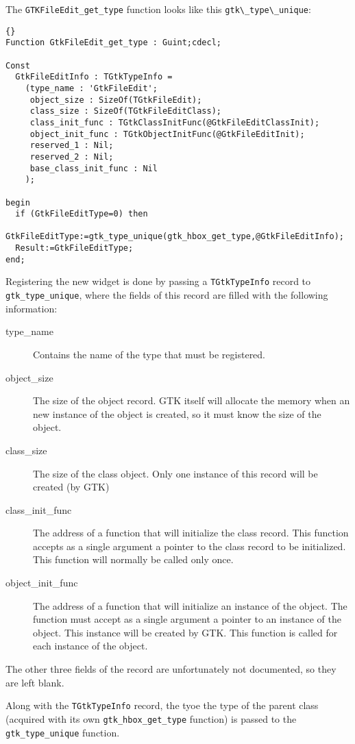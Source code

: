 \documentclass[10pt]{article}
\begin{document}
The \lstinline|GTKFileEdit_get_type| function looks like this
\lstinline|gtk\_type\_unique|:
\begin{lstlisting}{}
Function GtkFileEdit_get_type : Guint;cdecl;

Const
  GtkFileEditInfo : TGtkTypeInfo =
    (type_name : 'GtkFileEdit';   
     object_size : SizeOf(TGtkFileEdit);
     class_size : SizeOf(TGtkFileEditClass);
     class_init_func : TGtkClassInitFunc(@GtkFileEditClassInit);
     object_init_func : TGtkObjectInitFunc(@GtkFileEditInit);   
     reserved_1 : Nil;
     reserved_2 : Nil;
     base_class_init_func : Nil
    );

begin
  if (GtkFileEditType=0) then
    GtkFileEditType:=gtk_type_unique(gtk_hbox_get_type,@GtkFileEditInfo);
  Result:=GtkFileEditType;  
end;
\end{lstlisting}
Registering the new widget is done by passing a \lstinline|TGtkTypeInfo| 
record to \lstinline|gtk_type_unique|, where the fields of this record 
are filled with the following information:
\begin{description}
\item[type\_name] Contains the name of the type that must be registered. 
\item[object\_size] The size of the object record. GTK itself will allocate 
the memory when an new instance of the object is created, so it must know the
size of the object.  
\item[class\_size] The size of the class object. Only one instance of this
record will be created (by GTK)
\item[class\_init\_func] The address of a function that will initialize the
class record. This function accepts as a single argument a pointer to the
class record to be initialized. This function will normally be called only
once.
\item[object\_init\_func] The address of a function that will initialize 
an instance of the object. The function must accept as a single argument
a pointer to an instance of the object. This instance will be created by 
GTK. This function is called for each instance of the object.
\end{description}
The other three fields of the record are unfortunately not documented, so
they are left blank. 

Along with the \lstinline|TGtkTypeInfo| record, the tyoe the type of the 
parent class (acquired with its own \lstinline|gtk_hbox_get_type| 
function) is passed to the \lstinline|gtk_type_unique| function. 
\end{document}
